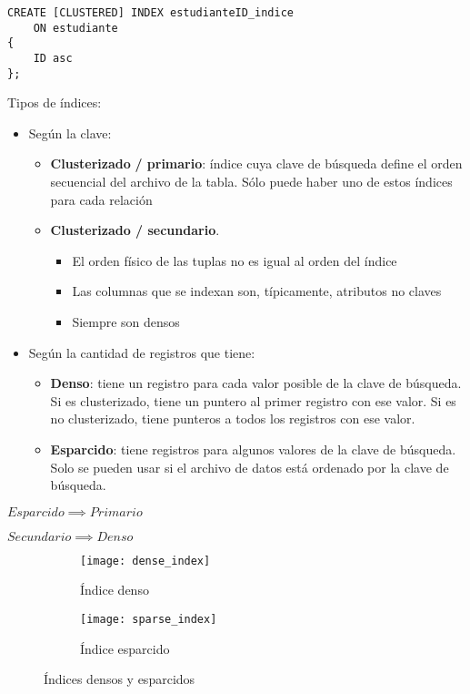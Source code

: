 \documentclass[a4paper, twoside]{article}
\begin{document}
\begin{lstlisting}
CREATE [CLUSTERED] INDEX estudianteID_indice
	ON estudiante
{
	ID asc
};
\end{lstlisting}

Tipos de índices:
\begin{itemize}
	\item Según la clave:
	\begin{itemize}
		\item \textbf{Clusterizado} \textbf{/ primario}: índice cuya clave de búsqueda define el orden secuencial del archivo de la tabla. Sólo puede haber uno de estos índices para cada relación
		\item \textbf{Clusterizado / secundario}.
		\begin{itemize}
			\item El orden físico de las tuplas no es igual al orden del índice
			\item Las columnas que se indexan son, típicamente, atributos no claves
			\item Siempre son densos
		\end{itemize}
	\end{itemize}

	\item Según la cantidad de registros que tiene:
	\begin{itemize}
		\item \textbf{Denso}: tiene un registro para cada valor posible de la clave de búsqueda. Si es clusterizado, tiene un puntero al primer registro con ese valor. Si es no clusterizado, tiene punteros a todos los registros con ese valor.
		\item \textbf{Esparcido}: tiene registros para algunos valores de la clave de búsqueda. Solo se pueden usar si el archivo de datos está ordenado por la clave de búsqueda.
	\end{itemize}
\end{itemize}

\begin{center}
	$Esparcido\implies Primario$
\end{center}

\begin{center}
	$Secundario\implies Denso$
\end{center}

\begin{figure}[H]
	\centering
	\begin{subfigure}{0.48\textwidth}
		\texttt{[image: dense\_index]}
		\caption{Índice denso}
	\end{subfigure}
	\begin{subfigure}{0.48\textwidth}
		\texttt{[image: sparse\_index]}
		\caption{Índice esparcido}
	\end{subfigure}	
	\caption{Índices densos y esparcidos}
\end{figure}
\end{document}
